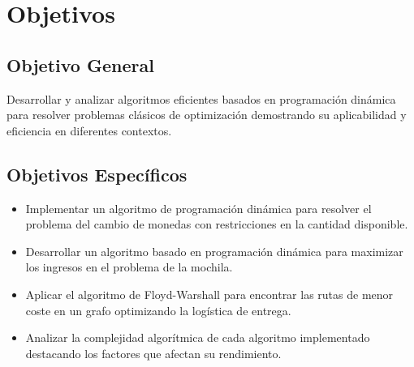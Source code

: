 \section{Objetivos}
\subsection{Objetivo General}
Desarrollar y analizar algoritmos eficientes basados en programación dinámica para resolver problemas clásicos de optimización demostrando su aplicabilidad y eficiencia en diferentes contextos.

\subsection{Objetivos Específicos}
\begin{itemize}
    \item Implementar un algoritmo de programación dinámica para resolver el problema del cambio de monedas con restricciones en la cantidad disponible.
    \item Desarrollar un algoritmo basado en programación dinámica para maximizar los ingresos en el problema de la mochila.
    \item Aplicar el algoritmo de Floyd-Warshall para encontrar las rutas de menor coste en un grafo optimizando la logística de entrega.
    \item Analizar la complejidad algorítmica de cada algoritmo implementado destacando los factores que afectan su rendimiento.
\end{itemize}
